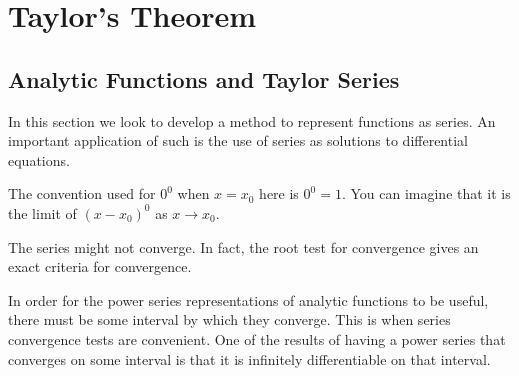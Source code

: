 	
	\chapter{Taylor's Theorem}
    \setcounter{exercisecounter}{0}

\setcounter{thmcounter}{1}
 \section{Analytic Functions and Taylor Series}
In this section we look to develop a method to represent functions as series. An important application of such is the use of series as solutions to differential equations. 

\begin{remark}
    The convention used for $0^0$ when $x=x_0$ here is $0^0=1$. You can imagine that it is the limit of $(x-x_0)^0$ as $x\to x_0$.
\end{remark}
\begin{remark}
    The series might not converge. In fact, the root test for convergence gives an exact criteria for convergence.
\end{remark}
In order for the power series representations of analytic functions to be useful, there must be some interval by which they converge. This is when series convergence tests are convenient. One of the results of having a power series that converges on some interval is that it is infinitely differentiable on that interval. 

